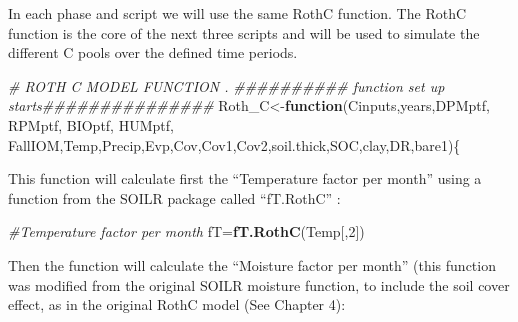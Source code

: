 \documentclass[
  10pt,
  b5paper,
]{book}
\newenvironment{Shaded}{\begin{snugshade}}{\end{snugshade}}
\newcommand{\CommentTok}[1]{\textcolor[rgb]{0.56,0.35,0.01}{\textit{#1}}}
\newcommand{\ControlFlowTok}[1]{\textcolor[rgb]{0.13,0.29,0.53}{\textbf{#1}}}
\newcommand{\DecValTok}[1]{\textcolor[rgb]{0.00,0.00,0.81}{#1}}
\newcommand{\KeywordTok}[1]{\textcolor[rgb]{0.13,0.29,0.53}{\textbf{#1}}}
\newcommand{\NormalTok}[1]{#1}
\begin{document}
In each phase and script we will use the same RothC function. The RothC function is the core of the next three scripts and will be used to simulate the different C pools over the defined time periods.

\begin{Shaded}
\begin{Highlighting}[]
\CommentTok{# ROTH C MODEL FUNCTION .}
\CommentTok{########## function set up starts############### }
\NormalTok{Roth_C<-}\ControlFlowTok{function}\NormalTok{(Cinputs,years,DPMptf, RPMptf, BIOptf, HUMptf, FallIOM,Temp,Precip,Evp,Cov,Cov1,Cov2,soil.thick,SOC,clay,DR,bare1)\{}
\end{Highlighting}
\end{Shaded}

This function will calculate first the ``Temperature factor per month'' using a function from the SOILR package called ``fT.RothC'' :

\begin{Shaded}
\begin{Highlighting}[]
\CommentTok{#Temperature factor per month}
\NormalTok{fT=}\KeywordTok{fT.RothC}\NormalTok{(Temp[,}\DecValTok{2}\NormalTok{]) }
\end{Highlighting}
\end{Shaded}

Then the function will calculate the ``Moisture factor per month'' (this function was modified from the original SOILR moisture function, to include the soil cover effect, as in the original RothC model (See Chapter 4):
\end{document}
